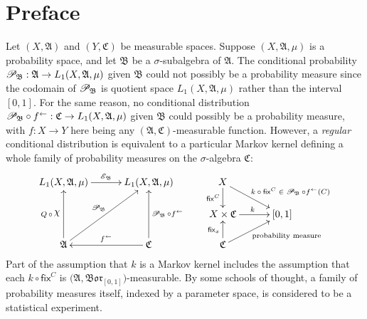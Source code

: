\documentclass[
twoside=true,
paper=letter,
fontsize=9pt,
pagesize=auto,
leqno,
openany,
headsepline,
overfullrule,
]{scrbook}
\theoremstyle{plain}
\theoremstyle{plain}
\theoremstyle{definition}
\theoremstyle{bfnoteitalic}
\theoremstyle{bfnoteroman}
\newcommand{\sigalg}[1]{\mathfrak{#1}}
\newcommand{\cali}[1]{\mathscr{#1}}
\newcommand{\sfop}[1]{\mathsf{#1}}
\newcommand{\condexpop}[1]{\mathop{\cali{E}\hspace{-1pt}}\nolimits_{#1}}
\newcommand{\condprobop}[1]{\mathop{\cali{P}\hspace{-1pt}}\nolimits_{#1}}
\newcommand{\borel}{\mathfrak{Bor}}
\newcommand{\textsigma}{\hbox{\large{$\sigma$}}\kern-1pt}
\newcommand{\charfunction}[1]{{\raisebox{2pt}{$\chi$}}_{#1}}
\newcommand{\preimage}[1]{#1^{\leftarrow}}
\newcommand{\sigmaalgebra}{\sigalg{A}}
\newcommand{\sigmaalgebraii}{\sigalg{B}}
\newcommand{\sigmaalgebraiii}{\sigalg{C}}
\newcommand{\Lone}{L_1(\measurespace, \sigmaalgebra, \measure)}
\newcommand{\function}{f}
\newcommand{\measurespace}{X}
\newcommand{\measurespaceii}{Y}
\newcommand{\mspaceelt}{x}
\newcommand{\measure}{\mu}
\newcommand{\setiii}{C}
\newcommand{\markovkernel}{k}
\newcommand{\fixinthefirst}[1]{\sfop{fix}_{#1}}
\newcommand{\fixinthesecond}[1]{\sfop{fix}^{#1}}
\begin{document}
\section{Preface}\label{bayesian_preface}

Let 
$(\measurespace, \sigmaalgebra)$ and 
$(\measurespaceii, \sigmaalgebraiii)$ be measurable spaces.
Suppose 
$(\measurespace,\sigmaalgebra,\measure)$
is a probability space, and let $\sigmaalgebraii$ be a \textsigma-subalgebra of 
$\sigmaalgebra$. 
The conditional probability 
$
\condprobop{\sigmaalgebraii}:
\sigmaalgebra \to 
L_1(\measurespace,\sigmaalgebra,\measure)
$
given $\sigmaalgebraii$ 
could not possibly be a probability measure since the  codomain
of $\condprobop{\sigmaalgebraii}$ is quotient space
$L_1(\measurespace,\sigmaalgebra,\measure)$ rather than the interval $[0,1]$.
For the same reason, no conditional distribution
${\condprobop{\sigmaalgebraii}}\circ \preimage{\function}
: \sigmaalgebraiii \to L_1(\measurespace,\sigmaalgebra,\measure)$
given $\sigmaalgebraii$
could possibly be a probability measure, 
with $\function:\measurespace\to\measurespaceii$ here being any 
$(\sigmaalgebra,\sigmaalgebraiii)$\hyp{}measurable function.
However, a \emph{regular} conditional distribution is equivalent to a particular Markov kernel defining a whole family of probability measures on the 
\textsigma-algebra $\sigmaalgebraiii$:
\[
\xymatrix@R=16pt@C=30pt{ 
\Lone \ar[r]^{\condexpop{\sigmaalgebraii}}
& \Lone 
& \measurespace 
\ar[d]_-{\fixinthesecond{\setiii}} 
\ar[dr]^{\qquad\text{$\markovkernel\circ\fixinthesecond{\setiii} \in \condprobop{\sigmaalgebraii}\circ \preimage{\function}(\setiii)$}}
\\
& 
& \measurespace\times\sigmaalgebraiii \ar[r]^{\markovkernel} 
& [0,1] 
\\
\sigmaalgebra 
\ar[uu]^{Q\,\circ\, \charfunction{}} 
\ar[uur]^{\condprobop{\sigmaalgebraii}} 
& \sigmaalgebraiii 
\ar[uu]_{\condprobop{\sigmaalgebraii}\circ \preimage{\function}} 
\ar[l]_{\preimage{\function}}
& \sigmaalgebraiii 
\ar[ur]_{\qquad\text{probability measure}} 
\ar[u]^{\fixinthefirst{\mspaceelt}} 
& 
\\
}
\]
Part of the assumption that $\markovkernel$ is a Markov kernel includes the assumption that each $\markovkernel\circ \fixinthesecond{\setiii}$ is
$\bigl(\sigmaalgebra,\borel_{[0,1]}\bigr)$\hyp{}measurable.
By some schools of thought, a family
of probability measures itself, indexed by a parameter space, is considered to be a statistical experiment.
\end{document}
